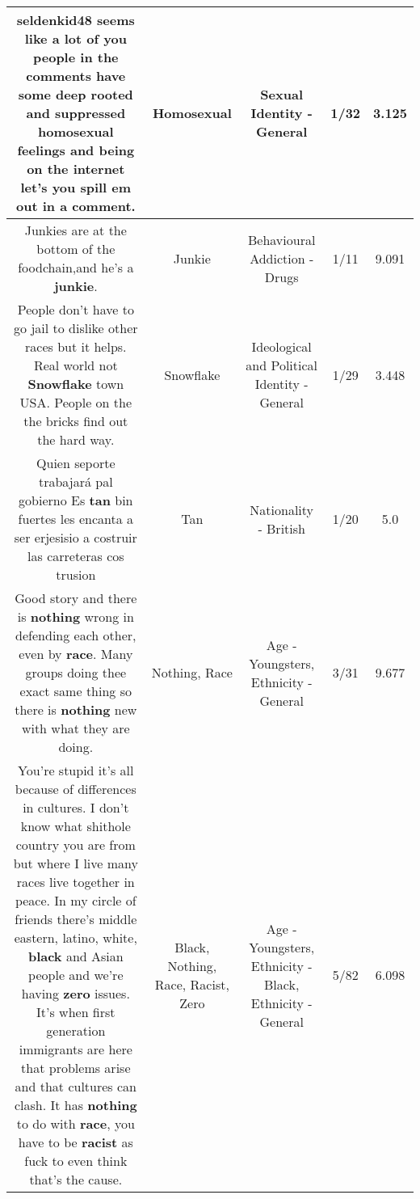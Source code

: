 \documentclass[11pt]{article}
\newlength\mylength
\begin{document}
\begin{center}
\begin{longtable}{|C{.65\mylength}|C{.30\mylength}|C{.12\mylength}|C{.12\mylength}|C{.12\mylength}|}
  \small seldenkid48 seems like a lot of you people in the comments have some deep rooted and suppressed \textbf{homosexual} feelings and being on the internet let's you spill em out in a comment.\normalsize   & Homosexual & Sexual Identity - General & 1/32 & 3.125 \\  \hline
  \small Junkies are at the bottom of the foodchain,and he's a \textbf{junkie}.\normalsize   & Junkie & Behavioural Addiction - Drugs & 1/11 & 9.091 \\  \hline
  \small People don't have to go jail to dislike other races but it helps.  Real world not \textbf{Snowflake} town USA. People on the the bricks find out the hard way.\normalsize   & Snowflake &  Ideological and Political Identity - General & 1/29 & 3.448 \\  \hline
  \small Quien seporte trabajará pal gobierno Es \textbf{tan} bin fuertes les encanta a ser erjesisio a costruir las carreteras cos trusion\normalsize   & Tan & Nationality - British & 1/20 & 5.0 \\  \hline
  \small Good story and there is \textbf{nothing} wrong in defending each other, even by \textbf{race}. Many groups doing thee exact same thing so there is \textbf{nothing} new with what they are doing.\normalsize   & Nothing, Race & Age - Youngsters, Ethnicity - General & 3/31 & 9.677 \\  \hline
  \small You're stupid it's all because of differences in cultures. I don't know what shithole country you are from but where I live many races live together in peace. In my circle of friends there's middle eastern, latino, white, \textbf{black} and Asian people and we're having \textbf{zero} issues. It's when first generation immigrants are here that problems arise and that cultures can clash. It has \textbf{nothing} to do with \textbf{race}, you have to be \textbf{racist} as fuck to even think that's the cause.\normalsize   & Black, Nothing, Race, Racist, Zero & Age - Youngsters, Ethnicity - Black, Ethnicity - General & 5/82 & 6.098 \\  \hline

\end{longtable}
\end{center}
\end{document}
